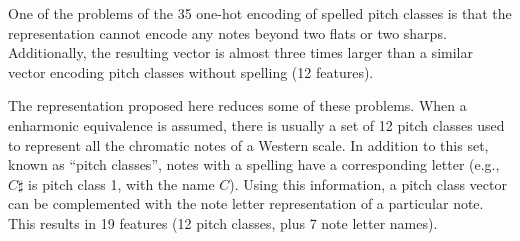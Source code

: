 
One of the problems of the 35 one-hot encoding of spelled
pitch classes is that the representation cannot encode any
notes beyond two flats or two sharps. Additionally, the
resulting vector is almost three times larger than a similar
vector encoding pitch classes without spelling (12
features).

The representation proposed here reduces some of these
problems. When a enharmonic equivalence is assumed, there is
usually a set of 12 pitch classes used to represent all the
chromatic notes of a Western scale. In addition to this set,
known as ``pitch classes'', notes with a spelling have a
corresponding letter (e.g., $C\sharp$ is pitch class 1, with
the name $C$). Using this information, a pitch class vector
can be complemented with the note letter representation of a
particular note. This results in 19 features (12 pitch
classes, plus 7 note letter names).